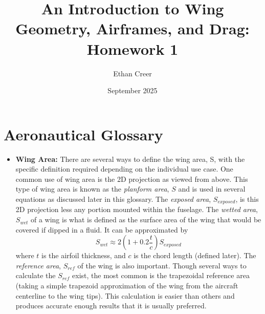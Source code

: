 \documentclass{article}
\title{An Introduction to Wing Geometry, Airframes, and Drag: Homework 1}
\author{Ethan Creer}
\date{September 2025}
\begin{document}
\maketitle
\section{Aeronautical Glossary}


\begin{itemize}
    \item[] \textbf{Wing Area:} There are several ways to define the wing area, S, with the specific definition 
    required depending on the individual use case. One common use of wing area is the 2D projection as viewed from above. 
    This type of wing area is known as the \textit{planform area}, $S$ and is used in several equations as 
    discussed later in this glossary. The \textit{exposed area}, $S_{exposed}$, is this 2D projection less any portion
    mounted within the fuselage.
    The \textit{wetted area}, $S_{wet}$ of a wing is what is defined as the surface area of the wing that would be covered if
    dipped in a fluid. It can be approximated by
    \begin{equation}
    S_{wet} \approx 2\left(1+0.2 \frac{t}{c}\right)S_{exposed}
    \end{equation}
    where $t$ is the airfoil thickness, and $c$ is the chord length (defined later).
    The \textit{reference area}, $S_{ref}$ of the wing is also important. 
    Though several ways to calculate the $S_{ref}$ exist, the most common is the trapezoidal reference
    area (taking a simple trapezoid approximation of the wing from the aircraft centerline to the wing tips). 
    This calculation is easier than others and produces accurate enough results that it is usually preferred.


\end{itemize}
\end{document}

